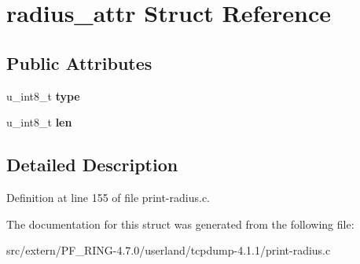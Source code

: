 \hypertarget{structradius__attr}{
\section{radius\_\-attr Struct Reference}
\label{structradius__attr}
}
\subsection*{Public Attributes}
\begin{DoxyCompactItemize}
\item 
\hypertarget{structradius__attr_af5565a666cad0b46f4c0ab0f238060be}{
u\_\-int8\_\-t {\bfseries type}}
\label{structradius__attr_af5565a666cad0b46f4c0ab0f238060be}

\item 
\hypertarget{structradius__attr_aa63a48617b8ed2941149f1f69215e825}{
u\_\-int8\_\-t {\bfseries len}}
\label{structradius__attr_aa63a48617b8ed2941149f1f69215e825}

\end{DoxyCompactItemize}


\subsection{Detailed Description}


Definition at line 155 of file print-\/radius.c.



The documentation for this struct was generated from the following file:\begin{DoxyCompactItemize}
\item 
src/extern/PF\_\-RING-\/4.7.0/userland/tcpdump-\/4.1.1/print-\/radius.c\end{DoxyCompactItemize}
